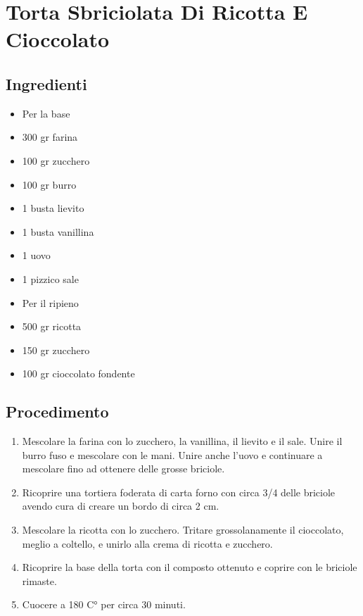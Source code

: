 \section{Torta Sbriciolata Di Ricotta E Cioccolato}
\subsection{Ingredienti}
\begin{itemize}
\item Per la base  
\item 300 gr farina  
\item 100 gr zucchero  
\item 100 gr burro   
\item 1 busta lievito  
\item 1 busta vanillina  
\item 1 uovo  
\item 1 pizzico sale  
\item Per il ripieno  
\item 500 gr ricotta  
\item 150 gr zucchero  
\item 100 gr cioccolato fondente
\end{itemize}
\subsection{Procedimento}
\begin{enumerate}
\item  Mescolare la farina con lo zucchero, la vanillina, il lievito e il sale. Unire il burro fuso e mescolare con le mani. Unire anche l'uovo e continuare a mescolare fino ad ottenere delle grosse briciole.  
\item  Ricoprire una tortiera foderata di carta forno con circa 3/4 delle briciole avendo cura di creare un bordo di circa 2 cm.  
\item  Mescolare la ricotta con lo zucchero. Tritare grossolanamente il cioccolato, meglio a coltello, e unirlo alla crema di ricotta e zucchero.  
\item  Ricoprire la base della torta con il composto ottenuto e coprire con le briciole rimaste.  
\item  Cuocere a 180 C° per circa 30 minuti.
\end{enumerate}

